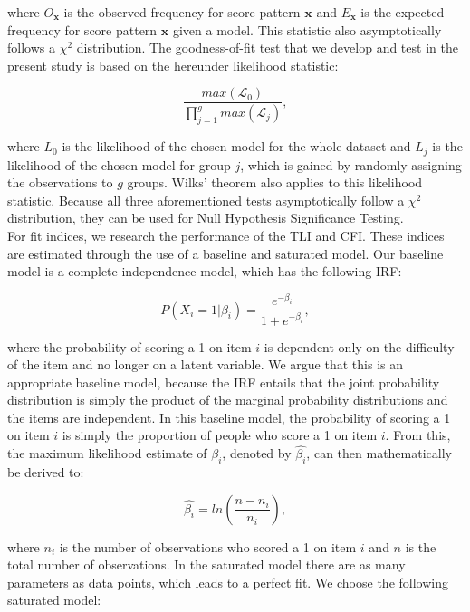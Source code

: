 \documentclass[Royal,sageapa,times,doublespace]{sagej}
\begin{document}
where $O_{\boldsymbol{x}}$ is the observed frequency for score pattern $\boldsymbol{x}$ and $E_{\boldsymbol{x}}$ is the expected frequency for score pattern $\boldsymbol{x}$ given a model. This statistic also asymptotically follows a $\chi^2$ distribution. The goodness-of-fit test that we develop and test in the present study is based on the hereunder likelihood statistic: 

\begin{equation}
\frac{max(\mathcal{L}_0)}{\prod_{j = 1}^g max(\mathcal{L}_j)},
\end{equation}
 
where $L_0$ is the likelihood of the chosen model for the whole dataset and $L_j$ is the likelihood of the chosen model for group $j$, which is gained by randomly assigning the observations to $g$ groups. Wilks' theorem also applies to this likelihood statistic. Because all three aforementioned tests asymptotically follow a $\chi^2$ distribution, they can be used for Null Hypothesis Significance Testing. \\
\indent For fit indices, we research the performance of the TLI and CFI. These indices are estimated through the use of a baseline and saturated model. Our baseline model is a complete-independence model, which has the following IRF:

\begin{equation}
P(X_i = 1 | \beta_{i}) = \frac{e^{- \beta_{i}}}{1 + e^{- \beta_{i}}},
\end{equation}

where the probability of scoring a 1 on item $i$ is dependent only on the difficulty of the item and no longer on a latent variable. We argue that this is an appropriate baseline model, because the IRF entails that the joint probability distribution is simply the product of the marginal probability distributions and the items are independent. In this baseline model, the probability of scoring a 1 on item $i$ is simply the proportion of people who score a 1 on item $i$. From this, the maximum likelihood estimate of $\beta_{i}$, denoted by $\hat{\beta_{i}}$, can then mathematically be derived to:


\begin{equation*}
\hat{\beta_{i}} = ln(\frac{n - n_i}{n_i}), 
\end{equation*}

where $n_i$ is the number of observations who scored a 1 on item $i$ and $n$ is the total number of observations. In the saturated model there are as many parameters as data points, which leads to a perfect fit. We choose the following saturated model:
\end{document}
